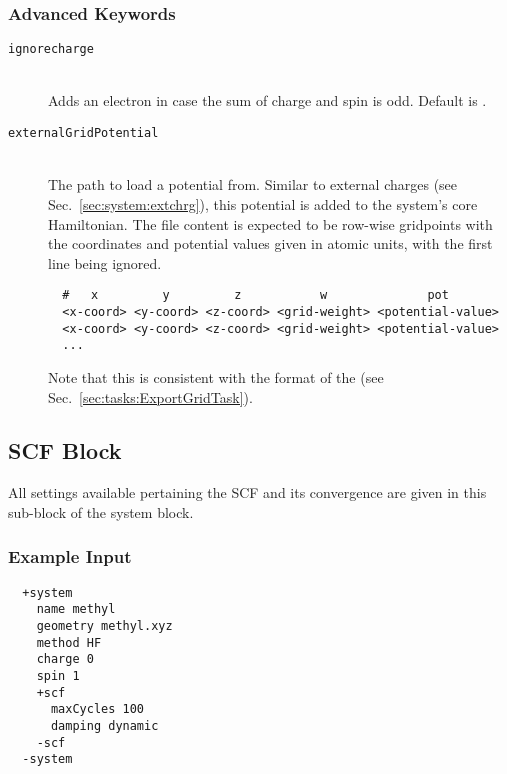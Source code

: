 \subsubsection{Advanced Keywords}
\begin{description}
  \item [\texttt{ignorecharge}]\hfill \\
  Adds an electron in case the sum of charge and spin is odd. Default is .
  \item [\texttt{externalGridPotential}]\hfill \\
  The path to load a potential from. Similar to external charges (see Sec.~\ref{sec:system:extchrg}), this potential is added to the system's core Hamiltonian. The file content is expected to be row-wise gridpoints with the coordinates and potential values given in atomic units, with the first line being ignored.
  \begin{lstlisting}
  #   x         y         z           w              pot   
  <x-coord> <y-coord> <z-coord> <grid-weight> <potential-value>
  <x-coord> <y-coord> <z-coord> <grid-weight> <potential-value>
  ...
  \end{lstlisting}
  Note that this is consistent with the format of the  (see Sec.~\ref{sec:tasks:ExportGridTask}).
\end{description}

\subsection{SCF Block}\label{sec:system:scf}
All settings available pertaining the SCF and its convergence are given in this sub-block of the system block.
\subsubsection{Example Input}
\begin{lstlisting}
  +system
    name methyl
    geometry methyl.xyz
    method HF
    charge 0
    spin 1
    +scf
      maxCycles 100
      damping dynamic
    -scf
  -system
 \end{lstlisting}
